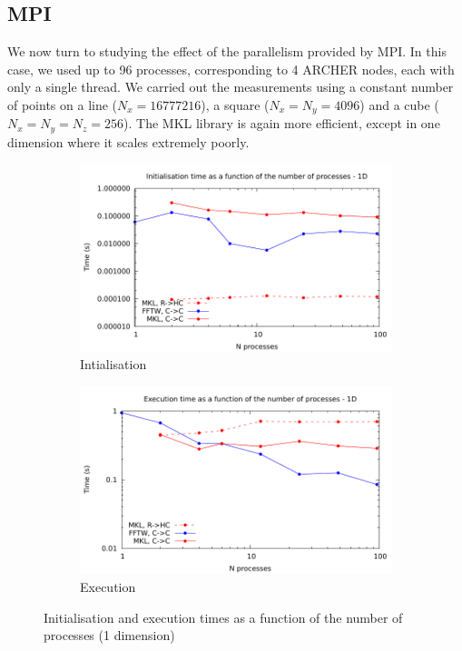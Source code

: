 \documentclass[12pt, a4paper]{article}
\begin{document}
\subsection{MPI}\label{MPI}
We now turn to studying the effect of the parallelism provided by MPI. In this case, we used up to 96 processes, corresponding to 4 ARCHER nodes, each with only a single thread. We carried out the measurements using a constant number of points on a line ($N_x=16777216$), a square ($N_x=N_y=4096$) and a cube ($N_x=N_y=N_z=256$). The MKL library is again more efficient, except in one dimension where it scales extremely poorly.
\begin{figure}[H]
\captionsetup{width=0.8\linewidth}
\centering
\begin{subfigure}{.5\textwidth}
\centering
\includegraphics[width=.9\linewidth]{graphs/mpi-init-1d.pdf}
\caption{Intialisation}
\label{1DMPII}
\end{subfigure}%
\begin{subfigure}{.5\textwidth}
\centering
\includegraphics[width=.9\linewidth]{graphs/mpi-exec-1d.pdf}
\caption{Execution}
\label{1DMPIE}
\end{subfigure}
\caption{Initialisation and execution times as a function of the number of processes (1 dimension)}
\label{1DMPI}
\end{figure}
\end{document}
